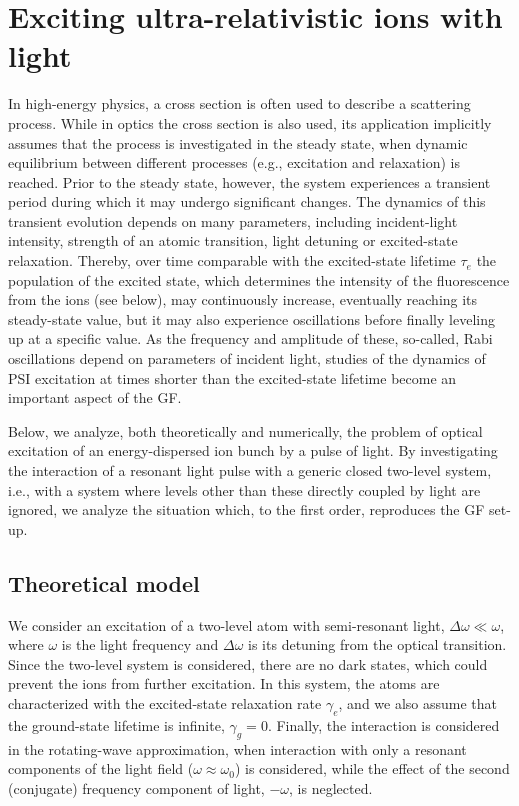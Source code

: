 \section{Exciting ultra-relativistic ions with light}
\label{sec:OptPump}

In high-energy physics, a cross section is often used to describe a scattering process. While in optics the cross section is also used, its application implicitly assumes that the process is investigated in the steady state, when dynamic equilibrium between different processes (e.g., excitation and relaxation) is reached.  Prior to the steady state, however, the system experiences a transient period during which it may undergo significant changes.  The dynamics of this transient evolution depends on many parameters, including incident-light intensity, strength of an atomic transition,
light detuning or excited-state relaxation.  Thereby, over time comparable with the excited-state lifetime $\tau_e$ the population of the excited state, which determines the intensity of the fluorescence from the ions (see below), may continuously increase, eventually reaching its steady-state value, but it may also experience oscillations before finally leveling up at a specific value.  As the frequency and amplitude of these, so-called, Rabi oscillations depend on parameters of incident light, studies of the dynamics of PSI excitation at times shorter than the excited-state lifetime become an important aspect of the GF.

Below, we analyze, both theoretically and numerically, the problem of optical excitation of an energy-dispersed ion bunch by a pulse of light.  By investigating the interaction of a resonant light pulse with a generic closed two-level system, i.e., with a system where levels other than these directly coupled by light are ignored, we analyze the situation which, to the first order, reproduces the GF set-up.  

\subsection{Theoretical model}

We consider an excitation of a two-level atom with semi-resonant light, $\Delta\omega\ll\omega$, where $\omega$ is the light frequency and $\Delta\omega$ is its detuning from the optical transition.  Since the two-level system is considered, there are no dark states, which could prevent the ions from further excitation.  In this system, the atoms are characterized with the excited-state relaxation rate $\gamma_e$, and we also assume that the ground-state lifetime is infinite, $\gamma_g=0$. Finally, the interaction is considered in the rotating-wave approximation, when interaction with only a resonant components of the light field ($\omega\approx\omega_0$) is considered, while the effect of the second (conjugate) frequency component of light, $-\omega$, is neglected.

